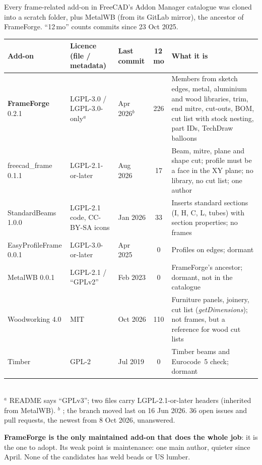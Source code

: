 Every frame-related add-on in FreeCAD's Addon Manager catalogue was cloned into a scratch folder, plus MetalWB (from its
GitLab mirror), the ancestor of FrameForge. ``12\,mo'' counts commits since 23 Oct 2025.
\begin{center}
\footnotesize
\begin{tabularx}{\linewidth}{@{}>{\raggedright\arraybackslash}p{2.5cm}>{\raggedright\arraybackslash}p{2.9cm}>{\raggedright\arraybackslash}p{1.7cm}cX@{}}
\toprule
Add-on & Licence (file / metadata) & Last commit & 12\,mo & What it is\\
\midrule
\textbf{FrameForge} 0.2.1 & LGPL-3.0 / LGPL-3.0-only$^{a}$ & 14 Apr 2026$^{b}$ & 226 & Members from sketch edges,
  metal, aluminium and wood libraries, trim, end mitre, cut-outs, BOM, cut list with stock nesting, part IDs,
  TechDraw balloons\\
freecad\_frame 0.1.1 & LGPL-2.1-or-later & 1 Aug 2026 & 17 & Beam, mitre, plane and shape cut; profile must be a
  face in the XY plane; no library, no cut list; one author\\
StandardBeams 1.0.0 & LGPL-2.1 code, CC-BY-SA icons & 23 Jan 2026 & 33 & Inserts standard sections (I, H, C, L,
  tubes) with section properties; no frames\\
EasyProfileFrame 0.0.1 & LGPL-3.0-or-later & 11 Apr 2025 & 0 & Profiles on edges; dormant\\
MetalWB 0.0.1 & LGPL-2.1 / ``GPLv2'' & 21 Feb 2023 & 0 & FrameForge's ancestor; dormant, not in the catalogue\\
Woodworking 4.0 & MIT & 6 Oct 2026 & 110 & Furniture panels, joinery, cut list (\emph{getDimensions}); not
  frames, but a reference for wood cut lists\\
Timber & GPL-2 & 11 Jul 2019 & 0 & Timber beams and Eurocode~5 check; dormant\\
\bottomrule
\end{tabularx}\\[2pt]
{\footnotesize $^{a}$ README says ``GPLv3''; two files carry LGPL-2.1-or-later headers (inherited from MetalWB).
$^{b}$ ; the  branch moved last on 16 Jun 2026. 36 open issues and pull requests, the newest
from 8 Oct 2026, unanswered.}
\end{center}
\textbf{FrameForge is the only maintained add-on that does the whole job}: it is the one to adopt. Its weak point is
maintenance: one main author, quieter since April. None of the candidates has weld beads or US lumber.

